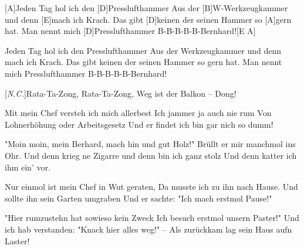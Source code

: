 \begin{guitar}
	
	[A]Jeden Tag hol ich den [D]Presslufthammer
	Aus der [B]W-Werkzeugkammer und denn [E]mach ich Krach.
	Das gibt [D]keinen der seinen Hammer so [A]gern hat.
	Man nennt mich [D]Presslufthammer B-B-B-B-B-Bernhard![E A]{}
	
	Jeden Tag hol ich den Presslufthammer
	Aus der Werkzeugkammer und denn mach ich Krach.
	Das gibt keinen der seinen Hammer so gern hat.
	Man nennt mich Presslufthammer B-B-B-B-B-Bernhard!
	
	[\textit{N.C.}]Rata-Ta-Zong, Rata-Ta-Zong, Weg ist der Balkon – Dong!
	
	Mit mein Chef versteh ich mich allerbest
	Ich jammer ja auch nie rum
	Von Lohnerhöhung oder Arbeitsgesetz
	Und er findet ich bin gar nich so dumm!
	
	"Moin moin, mein Berhard, mach hin und gut Holz!"
	Brüllt er mir manchmol ins Ohr.
	Und denn krieg ne Zigarre und denn bin ich ganz stolz
	Und denn katter ich ihm ein' vor.
	
	 
	
	Nur einmol ist mein Chef in Wut geraten,
	Da musste ich zu ihn nach Hause.
	Und sollte ihn sein Garten umgraben
	Und er sachte: "Ich mach erstmol Pause!"
	
	"Hier rumzustehn hat sowieso kein Zweck
	Ich besuch erstmol unsern Paster!"
	Und ich hab verstanden: "Knack hier alles weg!" –
	Als zurückkam lag sein Haus aufn Laster!
	
	 
\end{guitar}